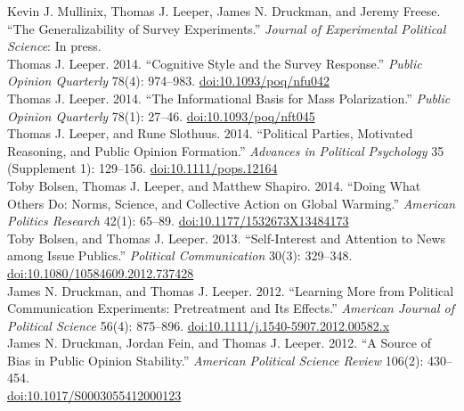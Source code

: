 \documentclass[12pt]{article}
\renewcommand{\section}[1]{\pagebreak[3]%
    \llap{\scshape\smash{\parbox[t]{\marginparwidth}{\raggedright {\color{lg}#1}}}}%
    \vspace{-\baselineskip}\par}
\newcommand{\topic}[1]{\pagebreak[3]\indent {\color{lg}{\footnotesize #1 }}\\}
\newcommand{\entry}[1]{\indent {\color{lg}\guillemotright}\hspace{2pt}#1\vspace{.25em}\\}
\begin{document}
\section{Selected\\Peer-Reviewed\\Publications}
\entry{Kevin J. Mullinix, Thomas J. Leeper, James N. Druckman, and Jeremy Freese. ``The Generalizability of Survey Experiments.'' {\em Journal of Experimental Political Science}: In press.}
\entry{Thomas J. Leeper. 2014. ``Cognitive Style and the Survey Response.'' {\em Public Opinion Quarterly} 78(4): 974--983. \href{http://dx.doi.org/10.1093/poq/nfu042}{doi:10.1093/poq/nfu042}}
\entry{Thomas J. Leeper. 2014. ``The Informational Basis for Mass Polarization.'' {\em Public Opinion Quarterly} 78(1): 27--46. \href{http://dx.doi.org/10.1093/poq/nft045}{doi:10.1093/poq/nft045}}
\entry{Thomas J. Leeper, and Rune Slothuus. 2014. ``Political Parties, Motivated Reasoning, and Public Opinion Formation.'' {\em Advances in Political Psychology} 35 (Supplement 1): 129--156. \href{http://dx.doi.org/10.1111/pops.12164}{doi:10.1111/pops.12164}}
\entry{Toby Bolsen, Thomas J. Leeper, and Matthew Shapiro. 2014. ``Doing What Others Do: Norms, Science, and Collective Action on Global Warming.'' {\em American Politics Research} 42(1): 65--89. \href{http://dx.doi.org/10.1177/1532673X13484173}{doi:10.1177/1532673X13484173}}
\entry{Toby Bolsen, and Thomas J. Leeper. 2013. ``Self-Interest and Attention to News among Issue Publics.'' {\em Political Communication} 30(3): 329--348.\\ \href{http://dx.doi.org/10.1080/10584609.2012.737428}{doi:10.1080/10584609.2012.737428}}
\entry{James N. Druckman, and Thomas J. Leeper. 2012. ``Learning More from Political Communication Experiments: Pretreatment and Its Effects.'' {\em American Journal of Political Science} 56(4): 875--896. \href{http://dx.doi.org/10.1111/j.1540-5907.2012.00582.x}{doi:10.1111/j.1540-5907.2012.00582.x}}
\entry{James N. Druckman, Jordan Fein, and Thomas J. Leeper. 2012. ``A Source of Bias in Public Opinion Stability.'' {\em American Political Science Review} 106(2): 430--454.\\ \href{http://dx.doi.org/10.1017/S0003055412000123}{doi:10.1017/S0003055412000123}}
\end{document}
